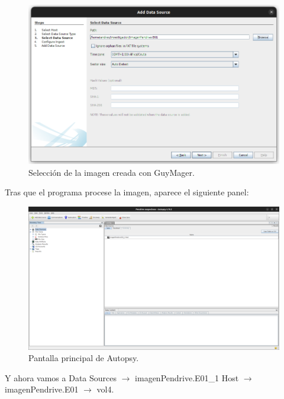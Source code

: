 \documentclass{article}
\begin{document}
\begin{figure}[H]
    \centering
    \includegraphics[width=\textwidth]{imagenes/Captura desde 2022-12-03 21-45-13.png}
    \caption{Selección de la imagen creada con GuyMager.}
\end{figure}

Tras que el programa procese la imagen, aparece el siguiente panel:

\begin{figure}[H]
    \centering
    \includegraphics[width=\textwidth]{imagenes/Captura desde 2022-12-03 21-46-02.png}
    \caption{Pantalla principal de Autopsy.}
\end{figure}

\newpage

Y ahora vamos a Data Sources $\rightarrow$ imagenPendrive.E01\_1 Host $\rightarrow$ imagenPendrive.E01 $\rightarrow$ vol4.
\end{document}
